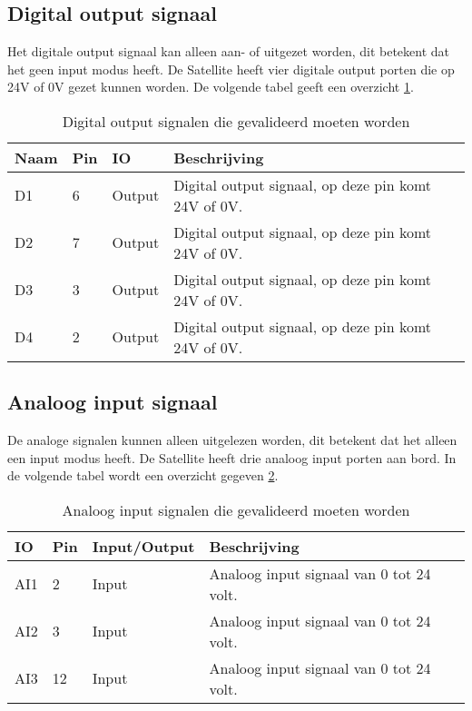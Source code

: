 \subsection{Digital output signaal}
Het digitale output signaal kan alleen aan- of uitgezet worden, dit betekent dat het geen input modus heeft. De Satellite heeft vier digitale output porten die op 24V of 0V gezet kunnen worden. De volgende tabel geeft een overzicht \ref{tab:hw_val_dio}.
\begin{table}[h!]
	\caption{Digital output signalen die gevalideerd moeten worden}
	\begin{tabular}{lllp{12cm}}
	\toprule
	\textbf{Naam} & \textbf{Pin} & \textbf{IO} & \textbf{Beschrijving}				 	\\ \toprule
	D1			  & 6    	& Output	& Digital output signaal, op deze pin komt 24V of 0V. \\
	D2			  & 7    	& Output	& Digital output signaal, op deze pin komt 24V of 0V. \\
	D3			  & 3    	& Output	& Digital output signaal, op deze pin komt 24V of 0V. \\
	D4			  & 2   	& Output	& Digital output signaal, op deze pin komt 24V of 0V. \\ \bottomrule
	\end{tabular}
	\label{tab:hw_val_dio}
\end{table}

\subsection{Analoog input signaal} \label{Analog Input Signaal}
De analoge signalen kunnen alleen uitgelezen worden, dit betekent dat het alleen een input modus heeft. De Satellite heeft drie analoog input porten aan bord. In de volgende tabel wordt een overzicht gegeven \ref{tab:hw_val_ai}.
\begin{table}[h!]
	\caption{Analoog input signalen die gevalideerd moeten worden}
	\begin{tabular}{lllp{12cm}}
	\toprule
	\textbf{IO} & \textbf{Pin} & \textbf{Input/Output} & \textbf{Beschrijving}			\\ \toprule
	AI1			& 2    	& Input		& Analoog input signaal van 0 tot 24 volt.					\\
	AI2			& 3    	& Input		& Analoog input signaal van 0 tot 24 volt.					\\
	AI3			& 12   	& Input		& Analoog input signaal van 0 tot 24 volt.					\\  \bottomrule
	\end{tabular}
	\label{tab:hw_val_ai}
\end{table}


